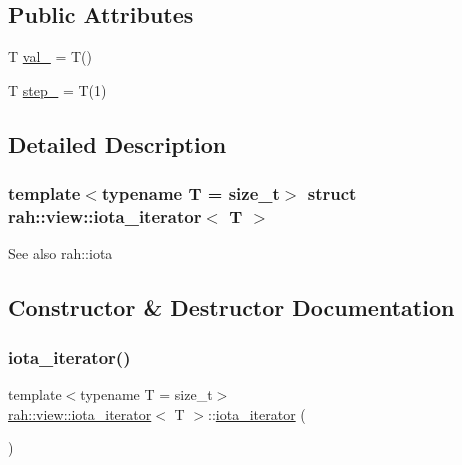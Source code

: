 \subsection*{Public Attributes}
\begin{DoxyCompactItemize}
\item 
T \mbox{\hyperlink{structrah_1_1view_1_1iota__iterator_a7a2ef77dc1a09b2eea42804c2297d057}{val\+\_\+}} = T()
\item 
T \mbox{\hyperlink{structrah_1_1view_1_1iota__iterator_ac30abc689d8d82810bf78ceec3893bd2}{step\+\_\+}} = T(1)
\end{DoxyCompactItemize}


\subsection{Detailed Description}
\subsubsection*{template$<$typename T = size\+\_\+t$>$\newline
struct rah\+::view\+::iota\+\_\+iterator$<$ T $>$}

\begin{DoxySeeAlso}{See also}
rah\+::iota 
\end{DoxySeeAlso}


\subsection{Constructor \& Destructor Documentation}
\mbox{\label{structrah_1_1view_1_1iota__iterator_ac6bb0b67f8d778854c3cb25aec3e9160}} 
\subsubsection{\texorpdfstring{iota\_iterator()}{iota\_iterator()}\hspace{0.1cm}{\footnotesize\ttfamily [1/4]}}
{\footnotesize\ttfamily template$<$typename T  = size\+\_\+t$>$ \\
\mbox{\hyperlink{structrah_1_1view_1_1iota__iterator}{rah\+::view\+::iota\+\_\+iterator}}$<$ T $>$\+::\mbox{\hyperlink{structrah_1_1view_1_1iota__iterator}{iota\+\_\+iterator}} (\begin{DoxyParamCaption}{ }\end{DoxyParamCaption})\hspace{0.3cm}{\ttfamily [default]}}

